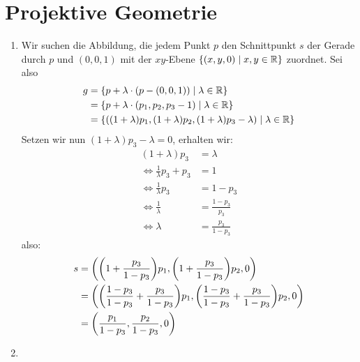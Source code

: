 \documentclass{article}
\begin{document}
	\section*{Projektive Geometrie}
	\begin{enumerate}
		\item[8.3 - \tbf{5}] 
		
		Wir suchen die Abbildung, die jedem Punkt $p$ den Schnittpunkt $s$ der Gerade durch $p$ und $(0,0,1)$ mit der $xy$-Ebene $\qty{(x,y,0) \mid x,y \in \mathbb{R}}$ zuordnet.
		Sei also 
		\begin{align*}
			g &= \qty{p + \lambda \cdot (p - (0,0,1)) \mid \lambda \in \mathbb{R}}\\
			&= \qty{p + \lambda \cdot (p_1, p_2, p_3 - 1) \mid \lambda \in \mathbb{R}}\\
			&= \qty{((1+ \lambda)p_1, (1+\lambda)p_2, (1+\lambda)p_3 - \lambda) \mid \lambda \in \mathbb{R}}
		\end{align*}
		Setzen wir nun $(1+ \lambda)p_3 - \lambda = 0$, erhalten wir:
		\begin{align*}
			(1 + \lambda)p_3 &= \lambda\\
			\Leftrightarrow 
			\frac{1}{\lambda}p_3 + p_3 &= 1\\
			\Leftrightarrow
			\frac{1}{\lambda}p_3 &= 1 - p_3\\
			\Leftrightarrow
			\frac{1}{\lambda} &= \frac{1 - p_3}{p_3}\\
			\Leftrightarrow
			\lambda &= \frac{p_3}{1 - p_3}
		\end{align*} 
		also:
		\begin{align*}
			s 
			&= \qty(\qty(1 + \frac{p_3}{1 - p_3})p_1, \qty(1 + \frac{p_3}{1 - p_3})p_2, 0)\\
			&= \qty(\qty(\frac{1 - p_3}{1 - p_3} + \frac{p_3}{1 - p_3})p_1, \qty(\frac{1 - p_3}{1 - p_3} + \frac{p_3}{1 - p_3})p_2, 0)\\
			&= \qty(\frac{p_1}{1 - p_3}, \frac{p_2}{1 - p_3}, 0)
		\end{align*}
		\item[9.1 - \tbf{4}]
		

\end{enumerate}
\end{document}
